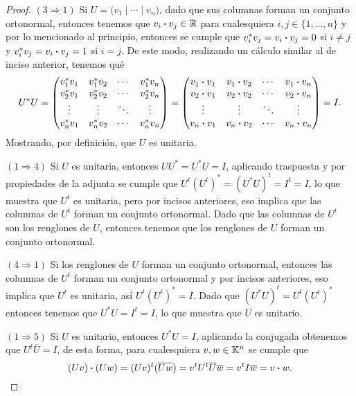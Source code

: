 \begin{proof}
  \medskip\noindent
  $(3 \Rightarrow 1)$ Si $U = \bigl( v_1 \mid \cdots \mid v_n \bigr)$, dado que sus columnas forman un conjunto ortonormal, entonces tenemos que $v_i \boldsymbol\cdot v_j \in \mathbb{R}$ para cualesquiera $i,j \in \{1,\ldots,n\}$ y por lo mencionado al principio, entonces se cumple que $ v_i^* v_j = v_i \boldsymbol\cdot v_j  = 0$ si $i \neq j$ y $v_i^* v_j = v_i \boldsymbol\cdot v_j  =  1$ si $i = j$. De este modo, realizando un cálculo similar al de inciso anterior, tenemos qué
  \[
    U^* U =
      \begin{pmatrix}
        v_1^* v_1 & v_1^* v_2 & \cdots & v_1^* v_n \\
        v_2^* v_1 & v_2^* v_2 & \cdots & v_2^* v_n \\
        \vdots & \vdots & \ddots & \vdots \\
        v_n^* v_1 & v_n^* v_2 & \cdots & v_n^* v_n 
      \end{pmatrix}  =
      \begin{pmatrix}
        v_1 \boldsymbol\cdot v_1 & v_1 \boldsymbol\cdot v_2 & \cdots & v_1 \boldsymbol\cdot v_n \\
        v_2 \boldsymbol\cdot v_1 & v_2 \boldsymbol\cdot v_2 & \cdots & v_2 \boldsymbol\cdot v_n \\
        \vdots & \vdots & \ddots & \vdots \\
        v_n \boldsymbol\cdot v_1 & v_n \boldsymbol\cdot v_2 & \cdots & v_n \boldsymbol\cdot v_n 
      \end{pmatrix} 
    = I.
  \]
  Mostrando, por definición, que $U$ es unitaria.

  \medskip\noindent
  $(1 \Rightarrow 4)$ Si $U$ es unitaria, entonces $UU^* = U^* U = I$, aplicando traspuesta y por propiedades de la adjunta se cumple que $U^t (U^t)^* = (U^* U)^t  = I^t = I$, lo que muestra que $U^t$ es unitaria, pero por incisos anteriores, eso implica que las columnas de $U^t$ forman un conjunto ortonormal. Dado que las columnas de $U^t$ son los renglones de $U$, entonces tenemos que los renglones de $U$ forman un conjunto ortonormal.

  \medskip\noindent
  $(4 \Rightarrow 1)$ Si los renglones de $U$ forman un conjunto ortonormal, entonces las columnas de $U^t$ forman un conjunto ortonormal y por incisos anteriores, eso implica que $U^t$ es unitaria, así $U^t (U^t)^* = I$. Dado que $(U^* U)^t = U^t (U^t)^* $ entonces tenemos que $U^* U = I^t = I$, lo que muestra que $U$ es unitario.

  \medskip\noindent
  $(1 \Rightarrow 5)$ Si $U$ es unitario, entonces $U^* U = I$, aplicando la conjugada obtenemos que $U^t \overline{U} = I$, de esta forma, para cualesquiera $v,w \in \mathbb{K}^n$ se cumple que 
      \[
        (Uv) \boldsymbol\cdot (Uw) = (Uv)^t (\overline{Uw}) = v^t U^t \overline{U}\overline{w} = v^t I \overline{w} = v\boldsymbol\cdot w.
      \]
  

\end{proof}
